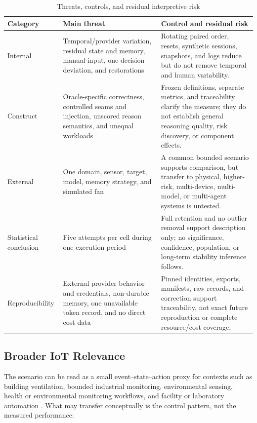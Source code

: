 \begin{table}[H]
\centering
\caption{Threats, controls, and residual interpretive risk}
\label{tab:discussion-validity}
\footnotesize
\begin{tabularx}{\textwidth}{L{0.21\textwidth}L{0.34\textwidth}Y}
\toprule
\textbf{Category} & \textbf{Main threat} & \textbf{Control and residual risk} \\
\midrule
Internal & Temporal/provider variation, residual state and memory, manual input,
one decision deviation, and restorations & Rotating paired order, resets,
synthetic sessions, snapshots, and logs reduce but do not remove temporal and
human variability. \\
Construct & Oracle-specific correctness, controlled seams and injection,
unscored reason semantics, and unequal workloads & Frozen definitions, separate
metrics, and traceability clarify the measure; they do not establish general
reasoning quality, risk discovery, or component effects. \\
External & One domain, sensor, target, model, memory strategy, and simulated fan
& A common bounded scenario supports comparison, but transfer to physical,
higher-risk, multi-device, multi-model, or multi-agent systems is untested. \\
Statistical conclusion & Five attempts per cell during one execution period &
Full retention and no outlier removal support description only; no significance,
confidence, population, or long-term stability inference follows. \\
Reproducibility & External provider behavior and credentials, non-durable memory,
one unavailable token record, and no direct cost data & Pinned identities,
exports, manifests, raw records, and correction support traceability, not exact
future reproduction or complete resource/cost coverage. \\
\bottomrule
\end{tabularx}
\end{table}

\subsection{Broader IoT Relevance}\label{subsec:discussion-relevance}

The scenario can be read as a small event--state--action proxy for contexts such
as building ventilation, bounded industrial monitoring, environmental sensing,
health or environmental monitoring workflows, and facility or laboratory
automation \cite{perera2014context,ur2016triggeraction,cui2025llmind}. What may transfer conceptually is the control pattern, not the
measured performance:

